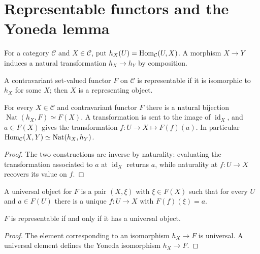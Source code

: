 \section{Representable functors and the Yoneda lemma}

For a category $\mathcal C$ and $X\in\mathcal C$, put
$h_X(U)=\operatorname{Hom}_{\mathcal C}(U,X)$.  A morphism $X\to Y$ induces a natural
transformation $h_X\to h_Y$ by composition.

\begin{definition}\label{fga-def-2-1}\uses{}
A contravariant set-valued functor $F$ on $\mathcal C$ is representable if it
is isomorphic to $h_X$ for some $X$; then $X$ is a representing object.
\end{definition}\begin{theorem}[Yoneda]\label{fga-thm-2-1}
For every $X\in\mathcal C$ and contravariant functor $F$ there is a natural
bijection $\operatorname{Nat}(h_X,F)\simeq F(X)$.  A transformation is sent
to the image of $\operatorname{id}_X$, and $a\in F(X)$ gives the transformation
$f:U\to X\mapsto F(f)(a)$.  In particular
$\operatorname{Hom}_{\mathcal C}(X,Y)\simeq\operatorname{Nat}(h_X,h_Y)$.
\end{theorem}
\begin{proof}
The two constructions are inverse by naturality: evaluating the transformation
associated to $a$ at $\operatorname{id}_X$ returns $a$, while naturality at
$f:U\to X$ recovers its value on $f$.
\end{proof}

\begin{definition}\label{fga-def-2-2}
A universal object for $F$ is a pair $(X,\xi)$ with $\xi\in F(X)$ such that
for every $U$ and $a\in F(U)$ there is a unique $f:U\to X$ with
$F(f)(\xi)=a$.
\end{definition}
\begin{proposition}\label{fga-prop-2-3}
$F$ is representable if and only if it has a universal object.
\end{proposition}
\begin{proof}
The element corresponding to an isomorphism $h_X\to F$ is universal.  A
universal element defines the Yoneda isomorphism $h_X\to F$.
\end{proof}

